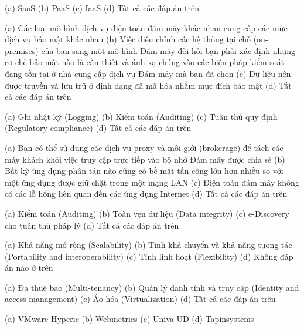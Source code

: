 
{(a) SaaS}
{(b) PaaS}
{(c) IaaS}
{(d) Tất cả các đáp án trên}

{(a) Các loại mô hình dịch vụ điện toán đám mây khác nhau cung cấp các mức dịch vụ bảo mật khác nhau}
{(b) Việc điều chỉnh các hệ thống tại chỗ (on-premises) của bạn sang một mô hình Đám mây đòi hỏi bạn phải xác định những cơ chế bảo mật nào là cần thiết và ánh xạ chúng vào các biện pháp kiểm soát đang tồn tại ở nhà cung cấp dịch vụ Đám mây mà bạn đã chọn}
{(c) Dữ liệu nên được truyền và lưu trữ ở định dạng đã mã hóa nhằm mục đích bảo mật}
{(d) Tất cả các đáp án trên}

{(a) Ghi nhật ký (Logging)}
{(b) Kiểm toán (Auditing)}
{(c) Tuân thủ quy định (Regulatory compliance)}
{(d) Tất cả các đáp án trên}

{(a) Bạn có thể sử dụng các dịch vụ proxy và môi giới (brokerage) để tách các máy khách khỏi việc truy cập trực tiếp vào bộ nhớ Đám mây được chia sẻ}
{(b) Bất kỳ ứng dụng phân tán nào cũng có bề mặt tấn công lớn hơn nhiều so với một ứng dụng được giữ chặt trong một mạng LAN}
{(c) Điện toán đám mây không có các lỗ hổng liên quan đến các ứng dụng Internet}
{(d) Tất cả các đáp án trên}

{(a) Kiểm toán (Auditing)}
{(b) Toàn vẹn dữ liệu (Data integrity)}
{(c) e-Discovery cho tuân thủ pháp lý}
{(d) Tất cả các đáp án trên}

{(a) Khả năng mở rộng (Scalability)}
{(b) Tính khả chuyển và khả năng tương tác (Portability and interoperability)}
{(c) Tính linh hoạt (Flexibility)}
{(d) Không đáp án nào ở trên}

{(a) Đa thuê bao (Multi-tenancy)}
{(b) Quản lý danh tính và truy cập (Identity and access management)}
{(c) Ảo hóa (Virtualization)}
{(d) Tất cả các đáp án trên}

{(a) VMware Hyperic}
{(b) Webmetrics}
{(c) Univa UD}
{(d) Tapinsystems}

